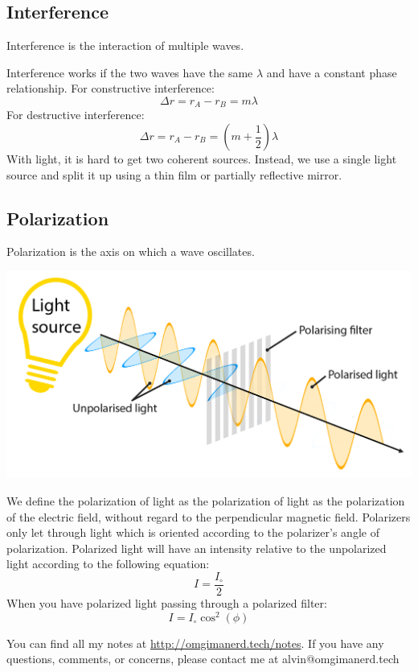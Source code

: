 \documentclass{math}
\begin{document}
\subsection*{Interference}
Interference is the interaction of multiple waves.
\begin{center}
\end{center}
Interference works if the two waves have the same \( \lambda \) and have a
constant phase relationship. For constructive interference:
\[ \Delta r = r_A-r_B = m\lambda \]
For destructive interference:
\[ \Delta r = r_A-r_B = (m+\frac{1}{2})\lambda \]
With light, it is hard to get two coherent sources. Instead, we use a single
light source and split it up using a thin film or partially reflective mirror.

\subsection*{Polarization}
Polarization is the axis on which a wave oscillates.
\begin{center}
  \includegraphics[width=16cm]{assets/polarization.png}
\end{center}
We define the polarization of light as the polarization of light as the
polarization of the electric field, without regard to the perpendicular magnetic
field. Polarizers only let through light which is oriented according to the
polarizer's angle of polarization. Polarized light will have an intensity
relative to the unpolarized light according to the following equation:
\[ I = \frac{I_{\circ}}{2} \]
When you have polarized light passing through a polarized filter:
\[ I = I_{\circ}\cos^2(\phi) \]

\begin{center}
  You can find all my notes at \url{http://omgimanerd.tech/notes}. If you have
  any questions, comments, or concerns, please contact me at
  alvin@omgimanerd.tech
\end{center}
\end{document}
